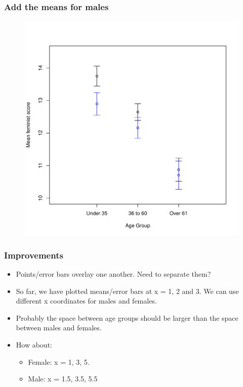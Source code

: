 \documentclass{beamer}\usepackage[]{graphicx}\usepackage[]{color}
\begin{document}
\begin{frame}[fragile]
  \frametitle{Add the means for males}

\begin{figure}[h]
  \vspace{-20pt}
  \centering
  \includegraphics[height = 0.7\textwidth, keepaspectratio]{Figure/m7}
  \label{fig:m7}
\end{figure}
\end{frame} 

\begin{frame}
\frametitle{Improvements}
\begin{itemize}
\item Points/error bars overlay one another. Need to separate them?
\item So far, we have plotted means/error bars at x = 1, 2 and 3. We can use different x coordinates for males and females.
\item Probably the space between age groups should be larger than the space between males and females.
\item How about:
  \begin{itemize}
    \item Female: x = 1, 3, 5.
    \item Male: x = 1.5, 3.5, 5.5
  \end{itemize}
\end{itemize}
\end{frame}
\end{document}

